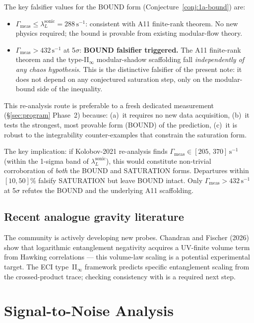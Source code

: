 \documentclass[12pt,a4paper]{article}
\newcommand{\lambdaL}{\lambda_L^{\mathrm{sonic}}}
\begin{document}
The key falsifier values for the BOUND form
(Conjecture~\ref{conj:1a-bound}) are:
\begin{itemize}
  \item $\Gamma_{\mathrm{meas}} \leq \lambdaL = 288\,\mathrm{s}^{-1}$:
    consistent with A11 finite-rank theorem.  No new physics
    required; the bound is provable from existing modular-flow theory.
  \item $\Gamma_{\mathrm{meas}} > 432\,\mathrm{s}^{-1}$ at 5$\sigma$:
    \textbf{BOUND falsifier triggered.}  The A11 finite-rank theorem
    and the type-II$_\infty$ modular-shadow scaffolding fall
    \emph{independently of any chaos hypothesis}.  This is the
    distinctive falsifier of the present note: it does not depend on
    any conjectured saturation step, only on the modular-bound
    side of the inequality.
\end{itemize}
This re-analysis route is preferable to a fresh dedicated measurement
(\S\ref{sec:program} Phase~2) because: (a)~it requires no new
data acquisition, (b)~it tests the strongest, most provable form
(BOUND) of the prediction, (c)~it is robust to the integrability
counter-examples \cite{avdoshkin2019,camargo2022,sreeram2025} that
constrain the saturation form.

\medskip
The key implication: if Kolobov-2021 re-analysis finds
$\Gamma_{\mathrm{meas}} \in [205,\,370]\,\mathrm{s}^{-1}$
(within the 1-sigma band of $\lambdaL$), this would constitute
non-trivial corroboration of \emph{both} the BOUND and SATURATION
forms.  Departures within $[10,50]\%$ falsify SATURATION but leave
BOUND intact.  Only $\Gamma_{\mathrm{meas}} > 432\,\mathrm{s}^{-1}$
at 5$\sigma$ refutes the BOUND and the underlying A11 scaffolding.

\subsection{Recent analogue gravity literature}

The community is actively developing new probes.
Chandran and Fischer (2026) \cite{chandran2026} show that logarithmic
entanglement negativity acquires a UV-finite volume term from Hawking
correlations --- this volume-law scaling is a potential experimental target.
The ECI type~II$_\infty$ framework predicts specific entanglement scaling
from the crossed-product trace; checking consistency with
\cite{chandran2026} is a required next step.

\section{Signal-to-Noise Analysis}
\label{sec:sn}
\end{document}
